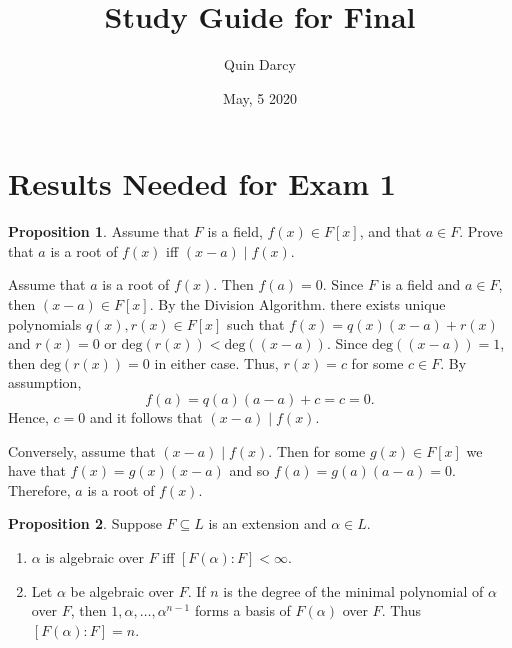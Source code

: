 \documentclass{article}
\makeatletter
\theoremstyle{definition}
\newtheorem{prop}{Proposition}[section]
\theoremstyle{remark}
\let\oldproofname=\proofname
\renewcommand{\proofname}{\textit{\oldproofname}}
\theoremstyle{definition}
\renewenvironment{proof}[1][\proofname]{\par
  \pushQED{\qed}%
  \normalfont \topsep6\p@\@plus6\p@\relax
  \list{}{\leftmargin=0mm
          \rightmargin=0mm
          \settowidth{\itemindent}{\itshape#1}%
          \labelwidth=\itemindent
          \parsep=0pt \listparindent=0mm%
  }
  \item[\hskip\labelsep
        \itshape
    #1\@addpunct{.}]\ignorespaces
}{%
  \popQED\endlist\@endpefalse
}
\makeatother
\begin{document}
\title{Study Guide for Final}
\author{Quin Darcy}
\date{May, 5 2020}
\maketitle

\section{Results Needed for Exam 1}
    \begin{prop}\label{prop:1.1}
        Assume that $F$ is a field, $f(x)\in F[x]$, and that $a\in F$. Prove that $a$ is a root of $f(x)$ iff $(x-a)\mid f(x)$.
    \end{prop}
        \begin{proof}
            Assume that $a$ is a root of $f(x)$. Then $f(a)=0$. Since $F$ is a field and $a\in F$, then $(x-a)\in F[x]$. By the Division Algorithm. there exists unique polynomials $q(x),r(x)\in F[x]$ such that $f(x)=q(x)(x-a)+r(x)$ and $r(x)=0$ or $\text{deg}(r(x))<\text{deg}((x-a))$. Since $\text{deg}((x-a))=1$, then $\text{deg}(r(x))=0$ in either case. Thus, $r(x)=c$ for some $c\in F$. By assumption, 
                \begin{equation*}
                    f(a)=q(a)(a-a)+c=c=0.
                \end{equation*}
            Hence, $c=0$ and it follows that $(x-a)\mid f(x)$.\par\hspace{4mm} Conversely, assume that $(x-a)\mid f(x)$. Then for some $g(x)\in F[x]$ we have that $f(x)=g(x)(x-a)$ and so $f(a)=g(a)(a-a)=0$. Therefore, $a$ is a root of $f(x)$.
        \end{proof}
    \begin{prop}\label{prop:1.2}
        Suppose $F\subseteq L$ is an extension and $\alpha\in L$.
            \begin{enumerate}[label=(\alph*)]
                \item $\alpha$ is algebraic over $F$ iff $[F(\alpha)\colon F]<\infty$.
                \item Let $\alpha$ be algebraic over $F$. If $n$ is the degree of the minimal polynomial of $\alpha$ over $F$, then $1,\alpha,\dots,\alpha^{n-1}$ forms a basis of $F(\alpha)$ over $F$. Thus $[F(\alpha)\colon F]=n$.
            \end{enumerate}
    \end{prop}
\end{document}
